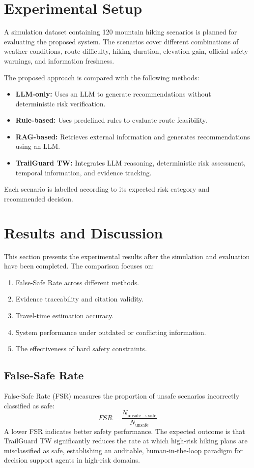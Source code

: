 \documentclass[conference]{IEEEtran}
\begin{document}
\section{Experimental Setup}
A simulation dataset containing 120 mountain hiking scenarios is planned for evaluating the proposed system. The scenarios cover different combinations of weather conditions, route difficulty, hiking duration, elevation gain, official safety warnings, and information freshness.

The proposed approach is compared with the following methods:
\begin{itemize}
    \item \textbf{LLM-only:} Uses an LLM to generate recommendations without deterministic risk verification.
    \item \textbf{Rule-based:} Uses predefined rules to evaluate route feasibility.
    \item \textbf{RAG-based:} Retrieves external information and generates recommendations using an LLM.
    \item \textbf{TrailGuard TW:} Integrates LLM reasoning, deterministic risk assessment, temporal information, and evidence tracking.
\end{itemize}

Each scenario is labelled according to its expected risk category and recommended decision.

\section{Results and Discussion}
This section presents the experimental results after the simulation and evaluation have been completed. The comparison focuses on:

\begin{enumerate}
    \item False-Safe Rate across different methods.
    \item Evidence traceability and citation validity.
    \item Travel-time estimation accuracy.
    \item System performance under outdated or conflicting information.
    \item The effectiveness of hard safety constraints.
\end{enumerate}

\subsection{False-Safe Rate}
False-Safe Rate (FSR) measures the proportion of unsafe scenarios incorrectly classified as safe:
\begin{equation}
FSR = \frac{N_{\mathrm{unsafe\rightarrow safe}}}{N_{\mathrm{unsafe}}}
\label{eq:fsr}
\end{equation}
A lower FSR indicates better safety performance. The expected outcome is that TrailGuard TW significantly reduces the rate at which high-risk hiking plans are misclassified as safe, establishing an auditable, human-in-the-loop paradigm for decision support agents in high-risk domains.
\end{document}
